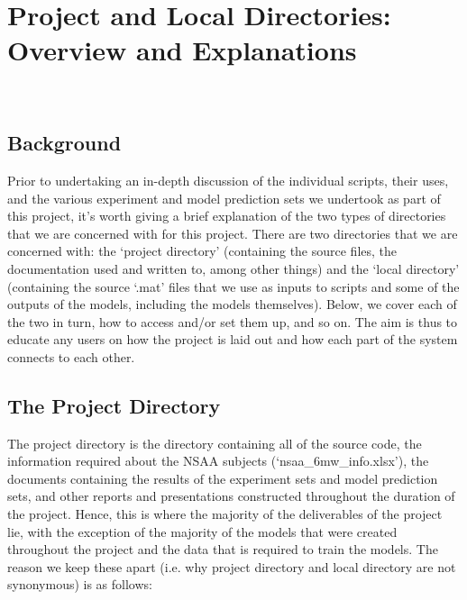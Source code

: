 \documentclass[12pt,twoside]{report}
\begin{document}
\chapter{Project and Local Directories: Overview and Explanations\\~\\}


\section{Background}

\quad Prior to undertaking an in-depth discussion of the individual scripts, their uses, and the various experiment and model prediction sets we undertook as part of this project, it’s worth giving a brief explanation of the two types of directories that we are concerned with for this project. There are two directories that we are concerned with: the ‘project directory’ (containing the source files, the documentation used and written to, among other things) and the ‘local directory’ (containing the source ‘.mat’ files that we use as inputs to scripts and some of the outputs of the models, including the models themselves). Below, we cover each of the two in turn, how to access and/or set them up, and so on. The aim is thus to educate any users on how the project is laid out and how each part of the system connects to each other.


\section{The Project Directory}

\quad The project directory is the directory containing all of the source code, the information required about the NSAA subjects (‘nsaa\_6mw\_info.xlsx’), the documents containing the results of the experiment sets and model prediction sets, and other reports and presentations constructed throughout the duration of the project. Hence, this is where the majority of the deliverables of the project lie, with the exception of the majority of the models that were created throughout the project and the data that is required to train the models. The reason we keep these apart (i.e. why project directory and local directory are not synonymous) is as follows:
\end{document}

